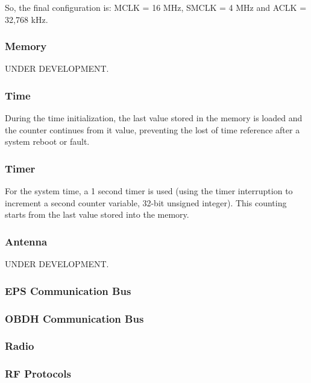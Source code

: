 \documentclass[12pt]{book}
\begin{document}
So, the final configuration is: MCLK = 16 MHz, SMCLK = 4 MHz and ACLK = 32,768 kHz.

\subsubsection{Memory}

UNDER DEVELOPMENT.

\subsubsection{Time}

During the time initialization, the last value stored in the memory is loaded and the counter continues from it value, preventing the lost of time reference after a system reboot or fault.

\subsubsection{Timer}

For the system time, a 1 second timer is used (using the timer interruption to increment a second counter variable, 32-bit unsigned integer). This counting starts from the last value stored into the memory.

\subsubsection{Antenna}

UNDER DEVELOPMENT.

\subsubsection{EPS Communication Bus}



\subsubsection{OBDH Communication Bus}



\subsubsection{Radio}



\subsubsection{RF Protocols}
\end{document}
